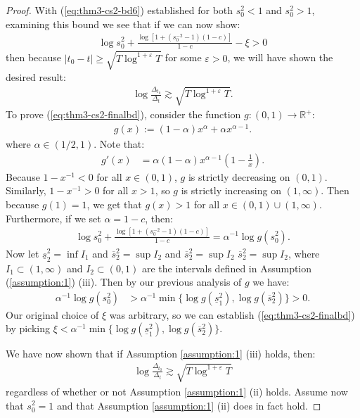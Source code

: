 \begin{proof}
With (\ref{eq:thm3-cs2-bd6}) established for both $s_0^2 < 1$ and $s_0^2 > 1$, examining this bound we see that if we can now show:
\begin{align}
    \log s_0^2 + \frac{\log[1 +  (s_0^{-2} -1)(1-c)]}{1-c} - \xi > 0 \label{eq:thm3-cs2-finalbd}
\end{align}
then because $|t_0-t| \geq \sqrt{T \log^{1+\varepsilon} T}$ for some $\varepsilon > 0$, we will have shown the desired result:
\begin{align*}
    \log \frac{\Delta_{t_0}}{\Delta_t} \gtrsim \sqrt{T \log^{1+\varepsilon} T}.
\end{align*}
To prove (\ref{eq:thm3-cs2-finalbd}), consider the function $g: (0,1) \to \mathbb{R}^+$:
\begin{align*}
    g(x) := (1-\alpha)x^\alpha + \alpha x^{\alpha - 1}.
\end{align*}
where $\alpha \in (1/2,1)$. Note that:
\begin{align*}
    g'(x) &= \alpha(1-\alpha)x^{\alpha-1}\left(1 - \frac{1}{x}
    \right).
\end{align*}
Because $1 - x^{-1} < 0$ for all $x \in (0,1)$, $g$ is strictly decreasing on $(0,1)$. Similarly, $1 - x^{-1} > 0$ for all $x > 1$, so $g$ is strictly increasing on $(1,\infty)$. Then because $g(1) = 1$, we get that $g(x) > 1$ for all $x \in (0,1)\cup(1,\infty)$. Furthermore, if we set $\alpha = 1 - c$, then:
\begin{align*}
    \log s_0^2 + \frac{\log[1 +  (s_0^{-2} -1)(1-c)]}{1-c} = \alpha^{-1}\log g(s_0^2).
\end{align*}
Now let $\underline{s}^2_2 = \inf I_1$ and $\overline{s}^2_2 = \sup I_2$ and $\overline{s}^2_2 = \sup I_2$ $\overline{s}^2_2 = \sup I_2$, where $I_1 \subset (1,\infty)$ and $I_2 \subset (0,1)$ are the intervals defined in Assumption (\ref{assumption:1}) (iii). Then by our previous analysis of $g$ we have:
\begin{align*}
    \alpha^{-1}\log g(s_0^2) &> \alpha^{-1}\min\{\log g(\underline{s}^2_1), \log g(\overline{s}^2_2)\} > 0.
\end{align*}
Our original choice of $\xi$ was arbitrary, so we can establish (\ref{eq:thm3-cs2-finalbd}) by picking $\xi < \alpha^{-1}\min\{\log g(\underline{s}^2_1), \log g(\overline{s}^2_2)\}.$

We have now shown that if Assumption \ref{assumption:1} (iii) holds, then:
\begin{align*}
    \log \frac{\Delta_{t_0}}{\Delta_t} \gtrsim \sqrt{T \log^{1+\varepsilon} T}
\end{align*}
regardless of whether or not Assumption \ref{assumption:1} (ii) holds. Assume now that $s_0^2 = 1$ and that Assumption \ref{assumption:1} (ii) does in fact hold. 


\end{proof}
